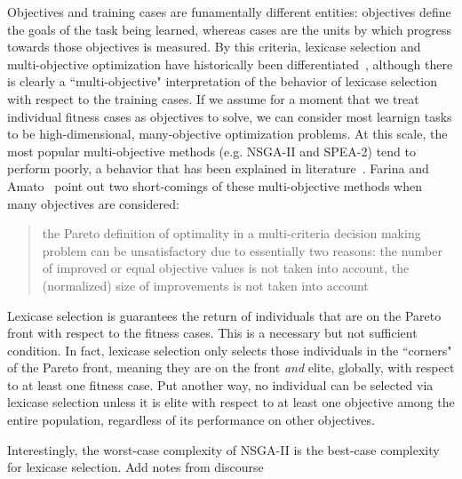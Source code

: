 \documentclass[preprint]{article}
\begin{document}
Objectives and training cases are funamentally different entities: objectives define the goals of the task being learned, whereas cases are the units by which progress towards those objectives is measured. By this criteria, lexicase selection and multi-objective optimization have historically been differentiated~\cite{helmuth_general_2015}, although there is clearly a ``multi-objective" interpretation of the behavior of lexicase selection with respect to the training cases. If we assume for a moment that we treat individual fitness cases as objectives to solve, we can consider most learnign tasks to be high-dimensional, many-objective optimization problems. At this scale, the most popular multi-objective methods (e.g. NSGA-II and SPEA-2) tend to perform poorly, a behavior that has been explained in literature~\cite{wagner_pareto-_2007, farina_optimal_2002}. Farina and Amato~\cite{farina_optimal_2002} point out two short-comings of these multi-objective methods when many objectives are considered: \begin{quote}
the Pareto definition of optimality in a multi-criteria decision making problem can be unsatisfactory due to essentially two reasons: the number of improved or equal objective values is not taken into account, the (normalized) size of improvements is not taken into account
\end{quote}

Lexicase selection is guarantees the return of individuals that are on the Pareto front with respect to the fitness cases. This is a necessary but not sufficient condition. In fact, lexicase selection only selects those individuals in the ``corners" of the Pareto front, meaning they are on the front {\it and} elite, globally, with respect to at least one fitness case. Put another way, no individual can be selected via lexicase selection unless it is elite with respect to at least one objective among the entire population, regardless of its performance on other objectives. 

Interestingly, the worst-case complexity of NSGA-II is the best-case complexity for lexicase selection. Add notes from discourse
\end{document}
